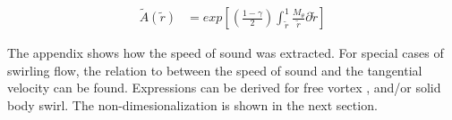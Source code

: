 \begin{align}
\tilde{A}(\tilde{r}) &= exp\left[\left(\frac{1 - \gamma}{2}\right)\int_{\tilde{r}}^{1}\frac{M_{\theta}}{\tilde{r}}{\partial \tilde{r}}\right]	
\end{align}

The appendix shows how the speed of sound was extracted.
For special cases of swirling flow, the relation to between the speed 
of sound and the tangential velocity can be found. Expressions can be derived 
for free vortex , and/or solid body swirl. The non-dimesionalization is shown in the
next section.


